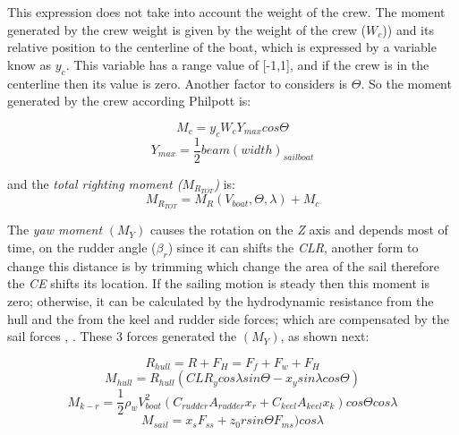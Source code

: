 This expression does not take into account the weight of the crew. The moment generated by the crew weight is given by the weight of the crew (\textit{$W_{c}$})) and its relative position to the centerline of the boat, which is expressed by a variable know as \textit{$y_{c}$}. This variable has a range value of [-1,1], and if the crew is in the centerline then its value is zero. Another factor to considers is $\Theta$. So the moment generated by the crew according Philpott \cite{philpott1993yacht} is: \par 
\begin{equation}\label{eq:Moment_crew}
    M_{c} = y_{c} W_{c} Y_{max} cos \Theta
\end{equation} 
\begin{equation} \label{eq:Mcrew_dist}
    Y_{max} = \frac{1}{2} beam(width)_{sailboat}
\end{equation}

and the \textit{total righting moment ($M_{R_{TOT}}$)} is:
\begin{equation} \label{eq:Mr_tot}
    M_{R_{TOT}}=M_{R}(V_{boat}, \Theta, \lambda) + M_{c}
\end{equation}

The \textit{yaw moment} $(M_{Y})$ causes the rotation on the \textit{Z} axis and depends most of time, on the rudder angle (\textit{$\beta_{r}$}) since it can shifts the \textit{CLR}, another form to change this distance is by trimming which change the area of the sail therefore the \textit{CE} shifts its location. If the sailing motion is steady then this moment is zero; otherwise, it can be calculated by the hydrodynamic resistance from the hull and the from the keel and rudder side forces; which are compensated by the sail forces \cite{philpott1993yacht}, \cite{claughton1998sailing}. These 3 forces generated the $(M_{Y})$, as shown next: \par
\begin{equation}\label{eq:Hull_R}
    R_{hull}=R+F_{H}=F_{f}+F_{w}+F_{H}
\end{equation}
\begin{equation}\label{eq:hull_moment}
   M_{hull}=R_{hull}(CLR_{y} cos \lambda sin \Theta - x_{y} sin \lambda cos \Theta) 
\end{equation}
\begin{equation}\label{eq:keel-rudder_moment}
   M_{k-r}=\frac{1}{2}\rho_{w} V_{boat}^2(C_{rudder}A_{rudder}x_{r}+C_{keel}A_{keel}x_{k})cos \Theta cos \lambda
\end{equation}
\begin{equation}\label{eq:sail_moment}
    M_{sail}=x_{s}F_{ss}+z_{0}r sin \Theta F_{ms}) cos \lambda
\end{equation}

